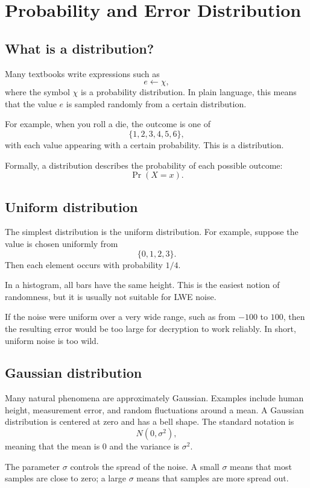 \chapter{Probability and Error Distribution}
\label{ch:prob}

\section{What is a distribution?}

Many textbooks write expressions such as
\[
e \leftarrow \chi,
\]
where the symbol $\chi$ is a probability distribution. In plain language, this means that the value $e$ is sampled randomly from a certain distribution.

For example, when you roll a die, the outcome is one of
\[
\{1,2,3,4,5,6\},
\]
with each value appearing with a certain probability. This is a distribution.

Formally, a distribution describes the probability of each possible outcome:
\[
\Pr(X=x).
\]

\section{Uniform distribution}

The simplest distribution is the uniform distribution. For example, suppose the value is chosen uniformly from
\[
\{0,1,2,3\}.
\]
Then each element occurs with probability $1/4$.

In a histogram, all bars have the same height. This is the easiest notion of randomness, but it is usually not suitable for LWE noise.

If the noise were uniform over a very wide range, such as from $-100$ to $100$, then the resulting error would be too large for decryption to work reliably. In short, uniform noise is too wild.

\section{Gaussian distribution}

Many natural phenomena are approximately Gaussian. Examples include human height, measurement error, and random fluctuations around a mean. A Gaussian distribution is centered at zero and has a bell shape. The standard notation is
\[
N(0,\sigma^2),
\]
meaning that the mean is $0$ and the variance is $\sigma^2$.

The parameter $\sigma$ controls the spread of the noise. A small $\sigma$ means that most samples are close to zero; a large $\sigma$ means that samples are more spread out.

